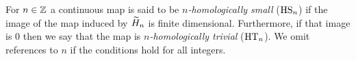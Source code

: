 \begin{defi} \label{defi:local_connectedness}
	For $n \in \mathbb{Z}$ a continuous map is said to be \textit{$n$-homologically small} ($\mathrm{HS}_n$) if the image of the map induced by $\widetilde{H}_{n}$ is finite dimensional.
	Furthermore, if that image is $0$ then we say that the map is \textit{$n$-homologically trivial} ($\mathrm{HT}_n$).
	We omit references to $n$ if the conditions hold for all integers.
\end{defi}







